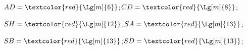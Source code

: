 \begin{corrige}
\begin{enumerate}
        $AD=\textcolor{red}{\Lg[m]{6}}$;\hfill$CD=\textcolor{red}{\Lg[m]{8}}$;\hfill
        
        $SH=\textcolor{red}{\Lg[m]{12}}$;\hfill$SA=\textcolor{red}{\Lg[m]{13}}$;\hfill
        
        $SB=\textcolor{red}{\Lg[m]{13}}$;\hfill$SD=\textcolor{red}{\Lg[m]{13}}$;\hfill
    \end{enumerate}
\end{corrige}

